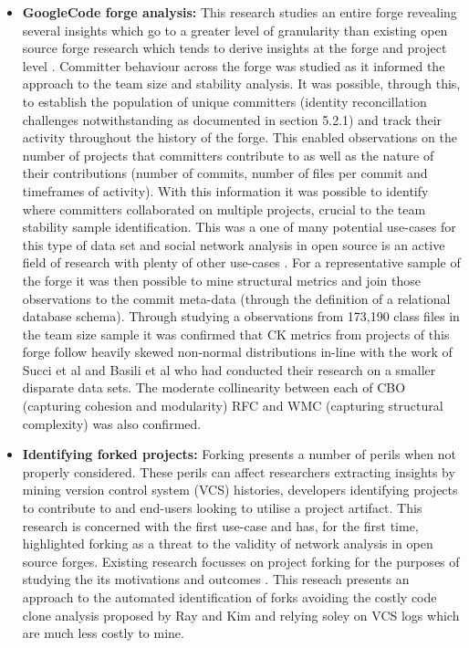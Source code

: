 \begin{itemize}
\item  \textbf{GoogleCode forge  analysis: } This research studies an entire forge revealing several insights which go to a greater level of granularity than existing open source forge research which tends to derive insights at the forge and project level \citep{squire2017lives} \citep{howison2009flossmole} \citep{iqbal2012integrating}. Committer behaviour across the forge was studied as it informed the approach to the team size and stability analysis. It was possible, through this, to establish the population of unique committers (identity reconcillation challenges notwithstanding as documented in section 5.2.1) and track their activity throughout the history of the forge. This enabled observations on the number of projects that committers contribute to as well as the nature of their contributions (number of commits, number of files per commit and timeframes of activity). With this information it was possible to identify where committers collaborated on multiple projects, crucial to the team stability sample identification. This was a one of many potential use-cases for this type of data set and social network analysis in open source is an active field of research with plenty of other use-cases \citep{hassan2008road, hemmati2013msr}. For a representative sample of the forge it was then possible to mine structural metrics and join those observations to the commit meta-data (through the definition of a relational database schema). Through studying a observations from 173,190 class files in the team size sample it was confirmed that CK metrics from projects of this forge follow heavily skewed non-normal distributions in-line with the work of Succi et al \citep{succi2005empirical} and Basili et al \citep{basili1996validation} who had conducted their research on a smaller disparate data sets. The moderate collinearity between each of CBO (capturing cohesion and modularity) RFC and WMC (capturing structural complexity) was also confirmed.

\item  \textbf{Identifying forked projects: } Forking presents a number of perils when not properly considered. These perils can affect researchers extracting insights by mining version control system (VCS) histories, developers identifying projects to contribute to and end-users looking to utilise a project artifact. This research is concerned with the first use-case and has, for the first time, highlighted forking as a threat to the validity of network analysis in open source forges. Existing research focusses on project forking for the purposes of studying the its motivations and outcomes \citep{robles2006mining} \citep{nyman2011fork}. This reseach presents an approach to the automated identification of forks avoiding the costly code clone analysis proposed by Ray and Kim \citep{ray2012repertoire} and relying soley on VCS logs which are much less costly to mine.


\end{itemize}

